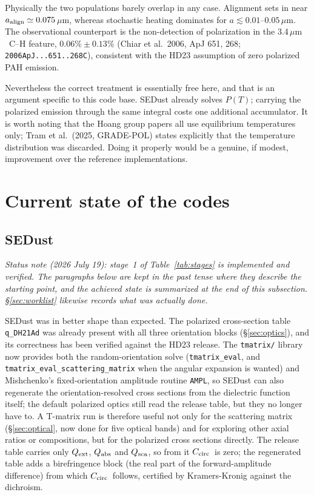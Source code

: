 \documentclass{my_memo}
\newcommand{\code}[1]{\texttt{#1}}
\newcommand{\um}{\ensuremath{\,\mu\mathrm{m}}}
\newcommand{\Ccirc}{\ensuremath{C_{\rm circ}}}
\newcommand{\aalign}{\ensuremath{a_{\rm align}}}
\begin{document}
Physically the two populations barely overlap in any case. Alignment sets
in near $\aalign \simeq 0.075$\um, whereas stochastic heating dominates
for $a \lesssim 0.01$--$0.05$\um. The observational counterpart is the
non-detection of polarization in the 3.4\um\ C--H feature, $0.06\% \pm
0.13\%$ (Chiar et al.\ 2006, ApJ 651, 268; \code{2006ApJ...651..268C}),
consistent with the HD23 assumption of zero polarized PAH emission.

Nevertheless the correct treatment is essentially free here, and that is
an argument specific to this code base. SEDust already solves $P(T)$;
carrying the polarized emission through the same integral costs one
additional accumulator. It is worth noting that the Hoang group papers
all use equilibrium temperatures only; Tram et al.\ (2025, GRADE-POL)
states explicitly that the temperature distribution was discarded. Doing
it properly would be a genuine, if modest, improvement over the reference
implementations.

\section{Current state of the codes}
\label{sec:codes}

\subsection{SEDust}

\emph{Status note (2026 July 19): stage~1 of Table~\ref{tab:stages} is
implemented and verified. The paragraphs below are kept in the past tense
where they describe the starting point, and the achieved state is
summarized at the end of this subsection. \S\ref{sec:worklist} likewise
records what was actually done.}

SEDust was in better shape than expected. The polarized cross-section
table \code{q\_DH21Ad} was already present with all three orientation
blocks (\S\ref{sec:optics}), and its correctness has been verified
against the HD23 release. The \code{tmatrix/} library now provides both the
random-orientation solve (\code{tmatrix\_eval}, and
\code{tmatrix\_eval\_scattering\_matrix} when the angular expansion is wanted)
and Mishchenko's fixed-orientation amplitude routine \code{AMPL},
so SEDust can also regenerate the orientation-resolved cross sections from the
dielectric function itself; the default polarized optics still read the release
table, but they no longer have to. A T-matrix run is therefore useful not only
for the scattering matrix (\S\ref{sec:optical}, now done for five optical bands)
and for exploring other axial ratios or compositions, but for the polarized cross
sections directly. The release table carries only $Q_{\rm ext}$, $Q_{\rm abs}$ and
$Q_{\rm sca}$, so from it \Ccirc\ is zero; the regenerated table adds a birefringence
block (the real part of the forward-amplitude difference) from which \Ccirc\ follows,
certified by Kramers-Kronig against the dichroism.
\end{document}
